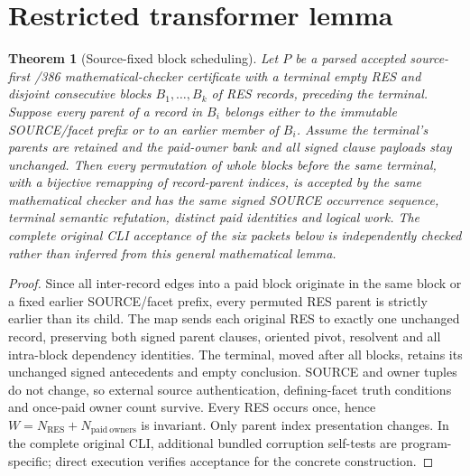 \documentclass[11pt]{article}
\newtheorem{theorem}{Theorem}
\begin{document}
\section*{Restricted transformer lemma}
\begin{theorem}[Source-fixed block scheduling]
Let $P$ be a parsed accepted source-first /386 mathematical-checker certificate with a terminal empty RES and disjoint consecutive blocks $B_1,\ldots,B_k$ of RES records, preceding the terminal. Suppose every parent of a record in $B_i$ belongs either to the immutable SOURCE/facet prefix or to an earlier member of $B_i$. Assume the terminal's parents are retained and the paid-owner bank and all signed clause payloads stay unchanged. Then every permutation of whole blocks before the same terminal, with a bijective remapping of record-parent indices, is accepted by the same mathematical checker and has the same signed SOURCE occurrence sequence, terminal semantic refutation, distinct paid identities and logical work. The complete original CLI acceptance of the six packets below is independently checked rather than inferred from this general mathematical lemma.
\end{theorem}
\begin{proof}
Since all inter-record edges into a paid block originate in the same block or a fixed earlier SOURCE/facet prefix, every permuted RES parent is strictly earlier than its child. The map sends each original RES to exactly one unchanged record, preserving both signed parent clauses, oriented pivot, resolvent and all intra-block dependency identities. The terminal, moved after all blocks, retains its unchanged signed antecedents and empty conclusion. SOURCE and owner tuples do not change, so external source authentication, defining-facet truth conditions and once-paid owner count survive. Every RES occurs once, hence $W=N_{\mathrm{RES}}+N_{\mathrm{paid\ owners}}$ is invariant. Only parent index presentation changes. In the complete original CLI, additional bundled corruption self-tests are program-specific; direct execution verifies acceptance for the concrete construction.\end{proof}
\end{document}
